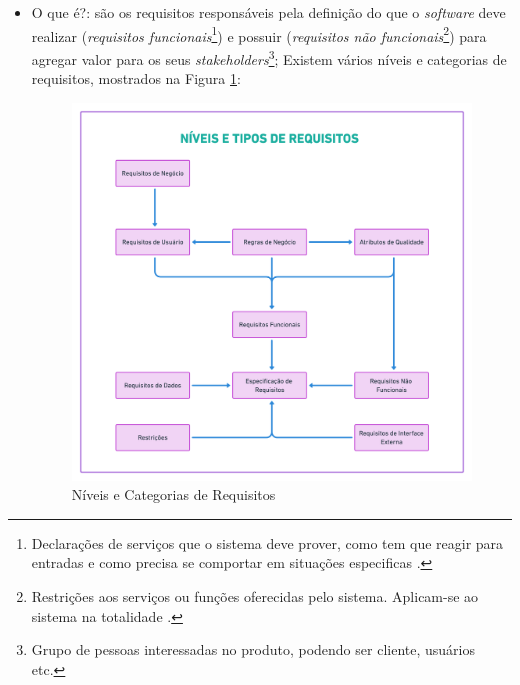 \begin{itemize}
    \item O que é?: são os requisitos responsáveis pela definição do que o \textit{software} deve realizar (\textit{requisitos funcionais}\footnote{Declarações de serviços que o sistema deve prover, como tem que reagir para entradas e como precisa se comportar em situações especificas \cite{Sommerville10}.}) e possuir (\textit{requisitos não funcionais}\footnote{Restrições aos serviços ou funções oferecidas pelo sistema. Aplicam-se ao sistema na totalidade \cite{Sommerville10}.}) para agregar valor para os seus \textit{stakeholders}\footnote{Grupo de pessoas interessadas no produto, podendo ser cliente, usuários etc.}; Existem vários níveis e categorias de requisitos, mostrados na Figura \ref{lev_tipo_req}:
    
    \begin{figure}[htb]
        \begin{center}
            \caption{Níveis e Categorias de Requisitos}
            \label{lev_tipo_req}
            \includegraphics[scale=0.15]{figuras/Embasamento/lev_tipo_req.png}
        \end{center}
    \end{figure}
    
    \begin{itemize}
    

\end{itemize}
\end{itemize}
